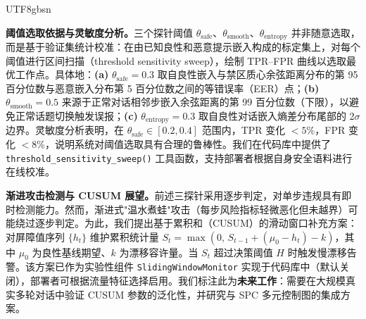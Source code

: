 \documentclass[letterpaper,twocolumn,10pt]{article}
\begin{document}
\begin{CJK}{UTF8}{gbsn}
\noindent{}

\textbf{阈值选取依据与灵敏度分析。}三个探针阈值 $\theta_{\mathrm{safe}}$、$\theta_{\mathrm{smooth}}$、$\theta_{\mathrm{entropy}}$ 并非随意选取，而是基于验证集统计校准：在由已知良性和恶意提示嵌入构成的标定集上，对每个阈值进行区间扫描（threshold sensitivity sweep），绘制 TPR--FPR 曲线以选取最优工作点。具体地：\textbf{(a)} $\theta_{\mathrm{safe}} = 0.3$ 取自良性嵌入与禁区质心余弦距离分布的第 95 百分位数与恶意嵌入分布第 5 百分位数之间的等错误率（EER）点；\textbf{(b)} $\theta_{\mathrm{smooth}} = 0.5$ 来源于正常对话相邻步嵌入余弦距离的第 99 百分位数（下限），以避免正常话题切换触发误报；\textbf{(c)} $\theta_{\mathrm{entropy}} = 0.3$ 取自良性对话嵌入熵差分布尾部的 2$\sigma$ 边界。灵敏度分析表明，在 $\theta_{\mathrm{safe}} \in [0.2, 0.4]$ 范围内，TPR 变化 $<5\%$，FPR 变化 $<8\%$，说明系统对阈值选取具有合理的鲁棒性。我们在代码库中提供了 \texttt{threshold\_sensitivity\_sweep()} 工具函数，支持部署者根据自身安全语料进行在线校准。

\textbf{渐进攻击检测与 CUSUM 展望。}前述三探针采用逐步判定，对单步违规具有即时检测能力。然而，渐进式"温水煮蛙"攻击（每步风险指标轻微恶化但未越界）可能绕过逐步判定。为此，我们提出基于累积和（CUSUM）的滑动窗口补充方案：对屏障值序列 $\{h_t\}$ 维护累积统计量 $S_t = \max(0,\, S_{t-1} + (\mu_0 - h_t) - k)$，其中 $\mu_0$ 为良性基线期望、$k$ 为漂移容许量。当 $S_t$ 超过决策阈值 $H$ 时触发慢漂移告警。该方案已作为实验性组件 \texttt{SlidingWindowMonitor} 实现于代码库中（默认关闭），部署者可根据流量特征选择启用。我们标注此为\textbf{未来工作}：需要在大规模真实多轮对话中验证 CUSUM 参数的泛化性，并研究与 SPC 多元控制图的集成方案。


\end{CJK}
\end{document}
